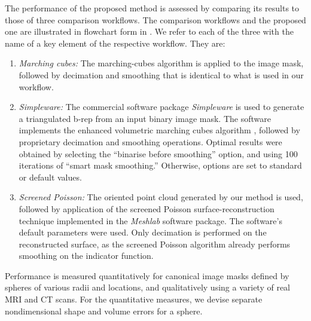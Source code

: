 The performance of the proposed method is assessed by comparing its results to those of three comparison workflows.  The comparison workflows and the proposed one are illustrated in flowchart form in .  We refer to each of the three with the name of a key element of the respective workflow.  They are:
\begin{enumerate}
\item  {\em Marching cubes:}  The marching-cubes algorithm is applied to the image mask, followed by decimation and smoothing that is identical to what is used in our workflow.
\item  {\em Simpleware:}  The commercial software package {\em Simpleware} is used to generate a triangulated b-rep from an input binary image mask.  The software implements the enhanced volumetric marching cubes algorithm \cite{young_2008}, followed by proprietary decimation and smoothing operations.  Optimal results were obtained by selecting the ``binarise before smoothing'' option, and using 100 iterations of ``smart mask smoothing.''  Otherwise, options are set to standard or default values.
\item  {\em Screened Poisson:}  The oriented point cloud generated by our method is used, followed by application of the screened Poisson surface-reconstruction technique \cite{kazhdan_2013} implemented in the \textit{Meshlab} software package.  The software's default parameters were used.  Only decimation is performed on the reconstructed surface, as the screened Poisson algorithm already performs smoothing on the indicator function.  
\end{enumerate}
Performance is measured quantitatively for canonical image masks defined by spheres of various radii and locations, and qualitatively using a variety of real MRI and CT scans.  For the quantitative measures, we devise separate nondimensional shape and volume errors for a sphere.  
